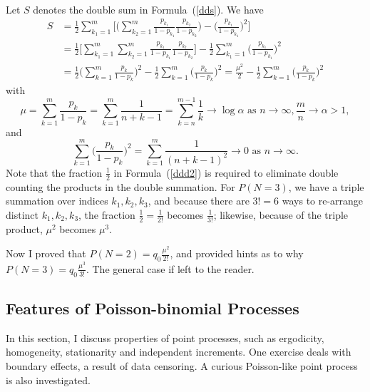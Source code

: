 \documentclass[10pt]{article}
\begin{document}
\begin{Exercise}
\begin{align}
\end{align}
Let $S$ denotes the double sum in Formula~(\ref{dds}). We have
\begin{align}
S & =\frac{1}{2}\sum_{k_1=1}^m \Big[ \Big(\sum_{k_2=1}^m \frac{p_{k_1}}{1-p_{k_1}}\frac{p_{k_2}}{1-p_{k_2}}\Big)-  \Big( \frac{p_{k_1}}{1-p_{k_1}}\Big)^2\Big]\label{ddd2}\\
 & = \frac{1}{2}\Big[\sum_{k_1=1}^m \sum_{k_2=1}^m \frac{p_{k_1}}{1-p_{k_1}}\frac{p_{k_2}}{1-p_{k_2}}\Big] - \frac{1}{2}\sum_{k_1=1}^m \Big( \frac{p_{k_1}}{1-p_{k_1}}\Big)^2 \nonumber \\
&  =\frac{1}{2} \Big(\sum_{k=1}^m \frac{p_{k}}{1-p_{k}}\Big)^2 - \frac{1}{2}\sum_{k=1}^m \Big( \frac{p_{k}}{1-p_{k}}\Big)^2 = \frac{\mu^2}{2}- \frac{1}{2}\sum_{k=1}^m \Big( \frac{p_{k}}{1-p_{k}}\Big)^2 \nonumber
\end{align}
with
$$\mu = \sum_{k=1}^m \frac{p_{k}}{1-p_{k}}=\sum_{k=1}^m\frac{1}{n+k-1}
=\sum_{k=n}^{m-1}\frac{1}{k} \rightarrow \log\alpha \mbox{ as  } n\rightarrow\infty,  \frac{m}{n} \rightarrow \alpha >1,$$
and
$$ \sum_{k=1}^m \Big( \frac{p_{k}}{1-p_{k}}\Big)^2 = \sum_{k=1}^m \frac{1}{(n+k-1)^2}\rightarrow 0 \mbox{ as } n\rightarrow\infty.$$
Note that the fraction $\frac{1}{2}$ in Formula~(\ref{ddd2}) is required to eliminate double counting the products in the double summation. For $P(N=3)$, we have a triple summation over indices $k_1, k_2, k_3$,
and because there are $3!=6$ ways to re-arrange distinct $k_1,k_2,k_3$, the fraction $\frac{1}{2}=\frac{1}{2!}$ becomes $\frac{1}{3!}$; likewise, because of the triple product, $\mu^2$ becomes $\mu^3$.

Now I proved that $P(N=2)=q_0\frac{\mu^2}{2!}$, and provided hints as to why $P(N=3)=q_0\frac{\mu^3}{3!}$. The general case if left to the reader.
\end{Exercise}


\subsection{Features of Poisson-binomial Processes}\label{fpbp}

In this section, I discuss properties of point processes, such as ergodicity, homogeneity, stationarity and independent increments. One exercise deals with boundary effects, a result of data censoring. A curious Poisson-like point process is also investigated.
\end{document}
